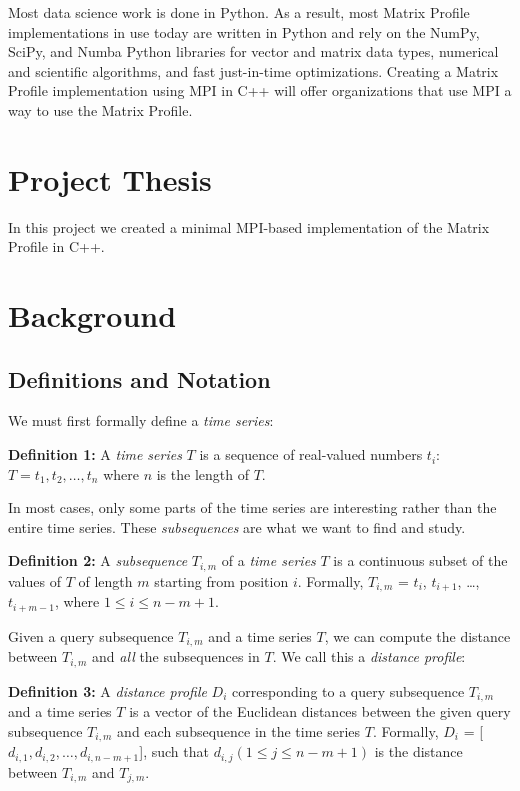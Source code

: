 \documentclass[conference]{IEEEtran}
\begin{document}
Most data science work is done in Python.  As a result, most Matrix Profile implementations in use today are written in Python\cite{Stumpy} and rely on the NumPy, SciPy, and Numba Python libraries for vector and matrix data types, numerical and scientific algorithms, and fast just-in-time optimizations.  Creating a Matrix Profile implementation using MPI in C++ will offer organizations that use MPI a way to use the Matrix Profile. 

\section{Project Thesis}
In this project we created a minimal MPI-based implementation of the Matrix Profile in C++.

\section{Background}
\subsection{Definitions and Notation}

We must first formally define a \emph{time series}:

\textbf{Definition 1:} A \emph{time series} $T$ is a sequence of real-valued numbers $t_i$: $T = t_1, t_2, \ldots{}, t_n$ where $n$ is the length of $T$.

In most cases, only some parts of the time series are interesting rather than the entire time series.  These \emph{subsequences} are what we want to find and study.

\textbf{Definition 2:} A \emph{subsequence} $T_{i,m}$ of a \emph{time series} $T$ is a continuous subset of the values of $T$ of length $m$ starting from position $i$.  Formally, $T_{i,m}$ = $t_i$, $t_{i+1}$, \ldots{}, $t_{i+m-1}$, where $1 \leq i \leq n-m+1$.

Given a query subsequence $T_{i,m}$ and a time series $T$, we can compute the distance between $T_{i,m}$ and \emph{all} the subsequences in $T$.  We call this a \emph{distance profile}:

\textbf{Definition 3:} A \emph{distance profile} $D_i$ corresponding to a query subsequence $T_{i,m}$ and a time series $T$ is a vector of the Euclidean distances between the given query subsequence $T_{i,m}$ and each subsequence in the time series $T$.  Formally, $D_i$ = [$d_{i,1}, d_{i,2}, \ldots{}, d_{i,n-m+1}$], such that $d_{i,j}(1 \leq j \leq n-m+1)$ is the distance between $T_{i,m}$ and $T_{j,m}$.
\end{document}
